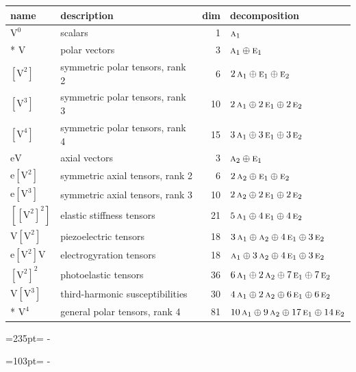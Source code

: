 \documentclass[10pt,a4paper]{article}
\newcommand{\needspace}[1]{\par\penalty-100\begingroup\dimen0=#1\relax\dimen2=\pagegoal
  \advance\dimen2-\pagetotal\ifdim\dimen0>\dimen2\relax\ifdim\dimen2>0pt\vfil\break\fi\fi
  \endgroup}
\numberwithin{equation}{section}
\newcommand{\irr}[1]{\text{\normalfont\scshape #1}}
\newcommand{\jahn}[1]{\mathrm{#1}}
\newlength{\fillwidth}\newlength{\cellwidth}\newlength{\colwidth}
\begin{document}
{\begin{longtable}{@{}llr>{\RaggedRight\arraybackslash}p{\fillwidth}@{}}
name & description & dim & decomposition\\\midrule\endhead
\bottomrule\endfoot\endlastfoot
$\jahn{V^{0}}$ & scalars & 1 & $\irr{a}_{1}$\\*
$\jahn{V}$ & polar vectors & 3 & $\irr{a}_{1} \oplus\allowbreak \irr{e}_{1}$\\
$\jahn{[V^{2}]}$ & symmetric polar tensors, rank 2 & 6 & $2\,\irr{a}_{1} \oplus\allowbreak \irr{e}_{1} \oplus\allowbreak \irr{e}_{2}$\\
$\jahn{[V^{3}]}$ & symmetric polar tensors, rank 3 & 10 & $2\,\irr{a}_{1} \oplus\allowbreak 2\,\irr{e}_{1} \oplus\allowbreak 2\,\irr{e}_{2}$\\
$\jahn{[V^{4}]}$ & symmetric polar tensors, rank 4 & 15 & $3\,\irr{a}_{1} \oplus\allowbreak 3\,\irr{e}_{1} \oplus\allowbreak 3\,\irr{e}_{2}$\\
$\jahn{eV}$ & axial vectors & 3 & $\irr{a}_{2} \oplus\allowbreak \irr{e}_{1}$\\
$\jahn{e[V^{2}]}$ & symmetric axial tensors, rank 2 & 6 & $2\,\irr{a}_{2} \oplus\allowbreak \irr{e}_{1} \oplus\allowbreak \irr{e}_{2}$\\
$\jahn{e[V^{3}]}$ & symmetric axial tensors, rank 3 & 10 & $2\,\irr{a}_{2} \oplus\allowbreak 2\,\irr{e}_{1} \oplus\allowbreak 2\,\irr{e}_{2}$\\
$\jahn{[[V^{2}]^{2}]}$ & elastic stiffness tensors & 21 & $5\,\irr{a}_{1} \oplus\allowbreak 4\,\irr{e}_{1} \oplus\allowbreak 4\,\irr{e}_{2}$\\
$\jahn{V[V^{2}]}$ & piezoelectric tensors & 18 & $3\,\irr{a}_{1} \oplus\allowbreak \irr{a}_{2} \oplus\allowbreak 4\,\irr{e}_{1} \oplus\allowbreak 3\,\irr{e}_{2}$\\
$\jahn{e[V^{2}]V}$ & electrogyration tensors & 18 & $\irr{a}_{1} \oplus\allowbreak 3\,\irr{a}_{2} \oplus\allowbreak 4\,\irr{e}_{1} \oplus\allowbreak 3\,\irr{e}_{2}$\\
$\jahn{[V^{2}]^{2}}$ & photoelastic tensors & 36 & $6\,\irr{a}_{1} \oplus\allowbreak 2\,\irr{a}_{2} \oplus\allowbreak 7\,\irr{e}_{1} \oplus\allowbreak 7\,\irr{e}_{2}$\\
$\jahn{V[V^{3}]}$ & third-harmonic susceptibilities & 30 & $4\,\irr{a}_{1} \oplus\allowbreak 2\,\irr{a}_{2} \oplus\allowbreak 6\,\irr{e}_{1} \oplus\allowbreak 6\,\irr{e}_{2}$\\*
$\jahn{V^{4}}$ & general polar tensors, rank 4 & 81 & $10\,\irr{a}_{1} \oplus\allowbreak 9\,\irr{a}_{2} \oplus\allowbreak 17\,\irr{e}_{1} \oplus\allowbreak 14\,\irr{e}_{2}$\\
\bottomrule\end{longtable}}
\needspace{235pt}
\needspace{103pt}
\end{document}
